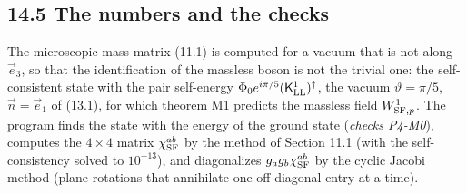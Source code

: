 \documentclass[
  10pt,
]{article}
\begin{document}
\hypertarget{the-numbers-and-the-checks}{%
\subsection{14.5 The numbers and the
checks}\label{the-numbers-and-the-checks}}

The microscopic mass matrix (11.1) is computed for a vacuum that is not
along \(\vec e_3\), so that the identification of the massless boson is
not the trivial one: the self-consistent state with the pair self-energy
\(\Phi_0e^{i\pi/5}(\mathsf K^1_{\rm LL})^\dagger\), the vacuum
\(\vartheta=\pi/5\), \(\vec n=\vec e_1\) of (13.1), for which theorem M1
predicts the massless field \(W^1_{{\rm SF},p}\). The program finds the
state with the energy of the ground state (\emph{checks P4-M0}),
computes the \(4\times4\) matrix \(\chi^{ab}_{\rm SF}\) by the method of
Section 11.1 (with the self-consistency solved to \(10^{-13}\)), and
diagonalizes \(g_ag_b\chi^{ab}_{\rm SF}\) by the cyclic Jacobi method
(plane rotations that annihilate one off-diagonal entry at a time).
\end{document}
